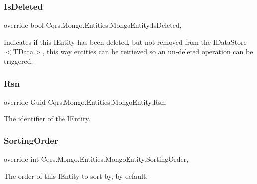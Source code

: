 \subsubsection{\texorpdfstring{Is\+Deleted}{IsDeleted}}
{\footnotesize\ttfamily override bool Cqrs.\+Mongo.\+Entities.\+Mongo\+Entity.\+Is\+Deleted\hspace{0.3cm}{\ttfamily [get]}, {\ttfamily [set]}}



Indicates if this I\+Entity has been deleted, but not removed from the I\+Data\+Store$<$\+T\+Data$>$, this way entities can be retrieved so an un-\/deleted operation can be triggered. 

\mbox{\label{classCqrs_1_1Mongo_1_1Entities_1_1MongoEntity_a445634030176c4991c0de152981c19ce_a445634030176c4991c0de152981c19ce}} 
\subsubsection{\texorpdfstring{Rsn}{Rsn}}
{\footnotesize\ttfamily override Guid Cqrs.\+Mongo.\+Entities.\+Mongo\+Entity.\+Rsn\hspace{0.3cm}{\ttfamily [get]}, {\ttfamily [set]}}



The identifier of the I\+Entity. 

\mbox{\label{classCqrs_1_1Mongo_1_1Entities_1_1MongoEntity_a2f22c031f0aaa7b1b5eb6798d43d1ed2_a2f22c031f0aaa7b1b5eb6798d43d1ed2}} 
\subsubsection{\texorpdfstring{Sorting\+Order}{SortingOrder}}
{\footnotesize\ttfamily override int Cqrs.\+Mongo.\+Entities.\+Mongo\+Entity.\+Sorting\+Order\hspace{0.3cm}{\ttfamily [get]}, {\ttfamily [set]}}



The order of this I\+Entity to sort by, by default. 

